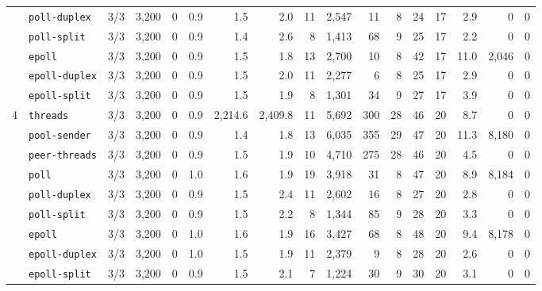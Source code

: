 \begin{longtable}{@{}llrrrrrrrrrrrrrrr@{}}
 & \texttt{poll-duplex} & 3/3 & 3{,}200 & 0 & 0.9 & 1.5 & 2.0 & 11 & 2{,}547 & 11 & 8 & 24 & 17 & 2.9 & 0 & 0 \\
 & \texttt{poll-split} & 3/3 & 3{,}200 & 0 & 0.9 & 1.4 & 2.6 & 8 & 1{,}413 & 68 & 9 & 25 & 17 & 2.2 & 0 & 0 \\
 & \texttt{epoll} & 3/3 & 3{,}200 & 0 & 0.9 & 1.5 & 1.8 & 13 & 2{,}700 & 10 & 8 & 42 & 17 & 11.0 & 2{,}046 & 0 \\
 & \texttt{epoll-duplex} & 3/3 & 3{,}200 & 0 & 0.9 & 1.5 & 2.0 & 11 & 2{,}277 & 6 & 8 & 25 & 17 & 2.9 & 0 & 0 \\
 & \texttt{epoll-split} & 3/3 & 3{,}200 & 0 & 0.9 & 1.5 & 1.9 & 8 & 1{,}301 & 34 & 9 & 27 & 17 & 3.9 & 0 & 0 \\
\midrule
4 & \texttt{threads} & 3/3 & 3{,}200 & 0 & 0.9 & 2{,}214.6 & 2{,}409.8 & 11 & 5{,}692 & 300 & 28 & 46 & 20 & 8.7 & 0 & 0 \\
 & \texttt{pool-sender} & 3/3 & 3{,}200 & 0 & 0.9 & 1.4 & 1.8 & 13 & 6{,}035 & 355 & 29 & 47 & 20 & 11.3 & 8{,}180 & 0 \\
 & \texttt{peer-threads} & 3/3 & 3{,}200 & 0 & 0.9 & 1.5 & 1.9 & 10 & 4{,}710 & 275 & 28 & 46 & 20 & 4.5 & 0 & 0 \\
 & \texttt{poll} & 3/3 & 3{,}200 & 0 & 1.0 & 1.6 & 1.9 & 19 & 3{,}918 & 31 & 8 & 47 & 20 & 8.9 & 8{,}184 & 0 \\
 & \texttt{poll-duplex} & 3/3 & 3{,}200 & 0 & 0.9 & 1.5 & 2.4 & 11 & 2{,}602 & 16 & 8 & 27 & 20 & 2.8 & 0 & 0 \\
 & \texttt{poll-split} & 3/3 & 3{,}200 & 0 & 0.9 & 1.5 & 2.2 & 8 & 1{,}344 & 85 & 9 & 28 & 20 & 3.3 & 0 & 0 \\
 & \texttt{epoll} & 3/3 & 3{,}200 & 0 & 1.0 & 1.6 & 1.9 & 16 & 3{,}427 & 68 & 8 & 48 & 20 & 9.4 & 8{,}178 & 0 \\
 & \texttt{epoll-duplex} & 3/3 & 3{,}200 & 0 & 1.0 & 1.5 & 1.9 & 11 & 2{,}379 & 9 & 8 & 28 & 20 & 2.6 & 0 & 0 \\
 & \texttt{epoll-split} & 3/3 & 3{,}200 & 0 & 0.9 & 1.5 & 2.1 & 7 & 1{,}224 & 30 & 9 & 30 & 20 & 3.1 & 0 & 0 \\
\end{longtable}
